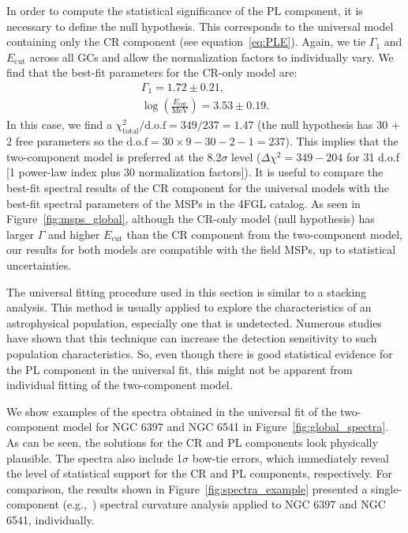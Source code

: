 \documentclass[doublespace,draft,nopageskip]{VTthesis} %
\begin{document}
In order to compute the statistical significance of the {PL} component, it is necessary to define the null hypothesis. This corresponds to the universal model containing only the CR component (see equation~\ref{eq:PLE}). Again, we tie $\Gamma_1$ and $E_\mathrm{cut}$ across all GCs and allow the normalization factors to individually vary. We find that the best-fit parameters for the CR-only model are:
\begin{align}\nonumber
    \Gamma_1 = 1.72 \pm 0.21, \\\nonumber
    \log\left(\frac{E_\mathrm{cut}}{\mathrm{MeV}}\right) = 3.53 \pm 0.19.
\end{align}
In this case, we find a $\chi^2_\mathrm{total} / \mathrm{d.o.f} = 349/237=1.47$ (the null hypothesis has 30 + 2 free parameters so the $\mathrm{d.o.f}=30\times 9 - 30 - 2 - 1 = 237$). This implies that the two-component model is preferred at the 8.2$\sigma$ level ($\Delta \chi^2=349-204$ for 31 d.o.f [1 power-law index plus 30 normalization factors]). It is useful to compare the best-fit spectral results of the CR component for the universal models with the best-fit spectral parameters of the MSPs in the 4FGL catalog. As seen in Figure~\ref{fig:msps_global}, although the CR-only model (null hypothesis) has larger $\Gamma$ and higher $E_\mathrm{cut}$ than the CR component from the two-component model, our results for both models are compatible with the field MSPs, up to statistical uncertainties.

The universal fitting procedure used in this section is similar to a stacking analysis. This method is usually applied to explore the characteristics of an astrophysical population, especially one that is undetected. Numerous studies have shown that this technique can increase the detection sensitivity to such population characteristics. So, even though there is good statistical evidence for the {PL} component in the universal fit,  this might not be apparent from individual fitting of the two-component model.

We show examples of the spectra obtained in the universal fit of the two-component model for NGC 6397 and NGC 6541 in Figure~\ref{fig:global_spectra}. As can be seen, the solutions for the CR and {PL} components look physically plausible. The spectra also include 1$\sigma$ bow-tie errors, which immediately reveal the level of statistical support for the CR and {PL} components, respectively. For comparison, the results shown in Figure~\ref{fig:spectra_example} presented a {single-component (e.g.,~\citet{2020ApJS..247...33A})} spectral curvature analysis applied to NGC 6397 and NGC 6541, individually. 
\end{document}
